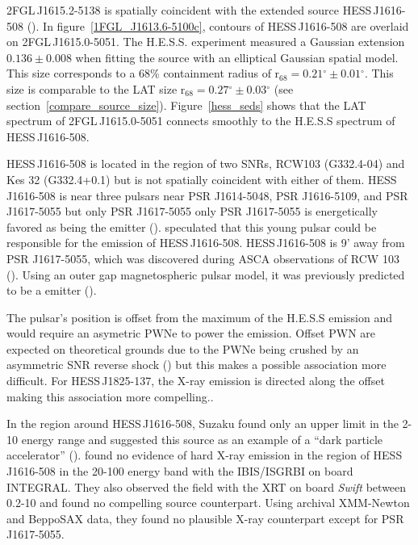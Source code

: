 \documentclass[12pt,preprint]{aastex}
\newcommand{\kev}{\text{Kev}\xspace}
\newcommand{\tev}{\text{TeV}\xspace}
\newcommand{\rsixeight}{{\ensuremath{\text{r}_{68}}}\xspace}
\renewcommand{\deg}{\ensuremath{^\circ}\xspace}
\begin{document}
2FGL\,J1615.2-5138 is spatially coincident with the extended
\tev source HESS\,J1616-508 (\cite{hess_plane_survey}).  In
figure~\ref{1FGL_J1613.6-5100c}, contours of HESS\,J1616-508 are overlaid
on 2FGL\,J1615.0-5051.  The H.E.S.S. experiment measured a Gaussian
extension $0.136\pm 0.008$ when fitting the source with an elliptical
Gaussian spatial model.  This size corresponds to a 68\% containment
radius of $\rsixeight=0.21\deg\pm0.01\deg$. This size is comparable to the LAT
size $\rsixeight=0.27\deg\pm0.03\deg$ (see section~\ref{compare_source_size}).
Figure~\ref{hess_seds} shows that the LAT spectrum of 2FGL\,J1615.0-5051
connects smoothly to the H.E.S.S spectrum of HESS\,J1616-508.

HESS\,J1616-508 is located in the region of two SNRs, RCW103 (G332.4-04)
and Kes 32 (G332.4+0.1) but is not spatially coincident with either
of them.  HESS\,J1616-508 is near three pulsars near PSR J1614-5048,
PSR J1616-5109, and PSR J1617-5055 but only PSR J1617-5055 only
PSR J1617-5055 is energetically favored as being the \tev emitter
(\cite{integral_HESS_J1616-508}).  \cite{hess_plane_survey}
speculated that this young pulsar could be responsible for the
emission of HESS\,J1616-508.  HESS\,J1616-508 is 9' away from PSR
J1617-5055, which was discovered during ASCA observations of RCW 103
(\cite{discovery_of_PSR_J1617-5055}). Using an outer gap magnetospheric
pulsar model, it was previously predicted to be a \tev emitter
(\cite{pulsar_tev_emission_predictions}).

The pulsar's position is offset from the maximum of the H.E.S.S
emission and would require an asymetric PWNe to power the \tev
emission. Offset PWN are expected on theoretical grounds due
to the PWNe being crushed by an asymmetric SNR reverse shock
(\cite{offset_pwn_ahronian,offset_pwn_blondin}) but this makes a
possible association more difficult.  For HESS\,J1825-137, the X-ray
emission is directed along the \tev offset making this association more
compelling.\cite{hess_j1825_hess}.


In the region around HESS\,J1616-508, Suzaku found only an upper limit
in the 2-10 \kev energy range and suggested this source as an example
of a ``dark particle accelerator'' (\cite{suzakzu_HESS_J1616-508}).
\cite{integral_HESS_J1616-508} found no evidence of hard X-ray emission
in the region of HESS\,J1616-508 in the 20-100 \kev energy band with the
IBIS/ISGRBI on board INTEGRAL. They also observed the field with the XRT
on board {\em Swift} between 0.2-10 \kev and found no compelling source
counterpart. Using archival XMM-Newton and BeppoSAX data, they found no
plausible X-ray counterpart except for PSR J1617-5055.
\end{document}
